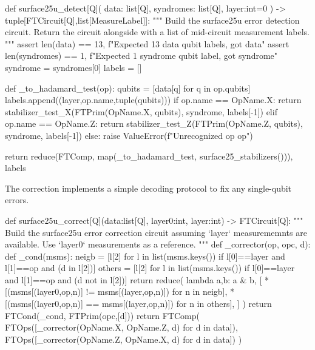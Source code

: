   \begin{python}
  def surface25u_detect[Q](
    data: list[Q], syndromes: list[Q], layer:int=0
  ) -> tuple[FTCircuit[Q],list[MeasureLabel]]:
    """ Build the surface25u error detection circuit. Return the circuit alongside with a list of
    mid-circuit measurement labels. """
    assert len(data) == 13, f"Expected 13 data qubit labels, got {data}"
    assert len(syndromes) == 1, f"Expected 1 syndrome qubit label, got {syndrome}"
    syndrome = syndromes[0]
    labels = []

    def _to_hadamard_test(op):
      qubits = [data[q] for q in op.qubits]
      labels.append((layer,op.name,tuple(qubits)))
      if op.name == OpName.X:
        return stabilizer_test_X(FTPrim(OpName.X, qubits), syndrome, labels[-1])
      elif op.name == OpName.Z:
        return stabilizer_test_Z(FTPrim(OpName.Z, qubits), syndrome, labels[-1])
      else:
        raise ValueError(f"Unrecognized op {op}")

    return reduce(FTComp, map(_to_hadamard_test, surface25_stabilizers())), labels
  \end{python}

\li The correction implements a simple decoding protocol to fix any single-qubit errors.

  \begin{python}
  def surface25u_correct[Q](data:list[Q], layer0:int, layer:int) -> FTCircuit[Q]:
    """ Build the surface25u error correction circuit assuming `layer` measurememnts are available.
    Use `layer0` measurements as a reference. """
    def _corrector(op, opc, d):
      def _cond(msms):
        neigb = [l[2] for l in list(msms.keys()) if l[0]==layer and l[1]==op and (d in l[2])]
        others = [l[2] for l in list(msms.keys()) if l[0]==layer and l[1]==op and (d not in l[2])]
        return reduce(
          lambda a,b: a & b, [
            *[(msms[(layer0,op,n)] != msms[(layer,op,n)]) for n in neigb],
            *[(msms[(layer0,op,n)] == msms[(layer,op,n)]) for n in others],
          ]
        )
      return FTCond(_cond, FTPrim(opc,[d]))
    return FTComp(
      FTOps([_corrector(OpName.X, OpName.Z, d) for d in data]),
      FTOps([_corrector(OpName.Z, OpName.X, d) for d in data])
    )
  \end{python}

